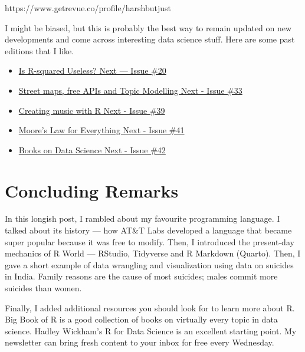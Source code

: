 \documentclass[
  letterpaper,
  DIV=11,
  numbers=noendperiod]{scrartcl}
\begin{document}
https://www.getrevue.co/profile/harshbutjust

I might be biased, but this is probably the best way to remain updated
on new developments and come across interesting data science stuff. Here
are some past editions that I like.

\begin{itemize}
\item
  \href{https://www.getrevue.co/profile/harshbutjust/issues/is-r-squared-useless-next-issue-20-1053921}{Is
  R-squared Useless? \textbar{} Next --- Issue \#20}
\item
  \href{https://www.getrevue.co/profile/harshbutjust/issues/street-maps-free-apis-and-topic-modelling-next-issue-33-1194833}{Street
  maps, free APIs and Topic Modelling \textbar{} Next - Issue \#33}
\item
  \href{https://www.getrevue.co/profile/harshbutjust/issues/creating-music-with-r-next-issue-39-1256602}{Creating
  music with R \textbar{} Next - Issue \#39}
\item
  \href{https://www.getrevue.co/profile/harshbutjust/issues/moore-s-law-for-everything-next-issue-41-1305182}{Moore's
  Law for Everything \textbar{} Next - Issue \#41}
\item
  \href{https://www.getrevue.co/profile/harshbutjust/issues/books-on-data-science-next-issue-42-1314984}{Books
  on Data Science \textbar{} Next - Issue \#42}
\end{itemize}

\hypertarget{concluding-remarks}{%
\section{Concluding Remarks}\label{concluding-remarks}}

In this longish post, I rambled about my favourite programming language.
I talked about its history --- how AT\&T Labs developed a language that
became super popular because it was free to modify. Then, I introduced
the present-day mechanics of R World --- RStudio, Tidyverse and R
Markdown (Quarto). Then, I gave a short example of data wrangling and
visualization using data on suicides in India. Family reasons are the
cause of most suicides; males commit more suicides than women.

Finally, I added additional resources you should look for to learn more
about R. Big Book of R is a good collection of books on virtually every
topic in data science. Hadley Wickham's R for Data Science is an
excellent starting point. My newsletter can bring fresh content to your
inbox for free every Wednesday.
\end{document}
